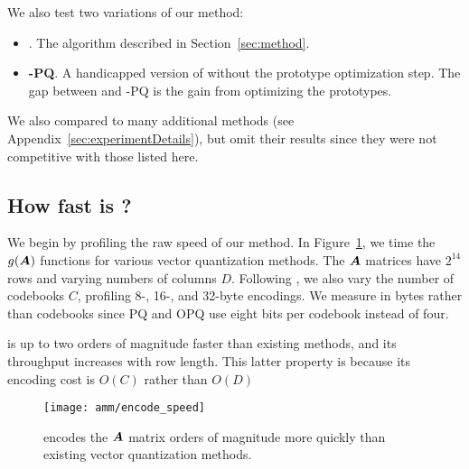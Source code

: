 We also test two variations of our method:
\vspace{-3mm}
\begin{itemize}\itemsep-.5mm
    \item \textbf{\ours}. The algorithm described in Section~\ref{sec:method}.
    \item \textbf{\ours-PQ}. A handicapped version of \oursp without the prototype optimization step. The gap between \oursp and \ours-PQ is the gain from optimizing the prototypes.
\end{itemize}
\vspace{-3mm}
We also compared to many additional methods (see Appendix~\ref{sec:experimentDetails}), but omit their results since they were not competitive with those listed here.

\vspace{-1mm}
\subsection{How fast is \ours?}
\vspace{-.5mm}

We begin by profiling the raw speed of our method. In Figure~\ref{fig:encodeSpeed}, we time the $g(\bm{A})$ functions for various vector quantization methods. The $\bm{A}$ matrices have $2^{14}$ rows and varying numbers of columns $D$. Following \citet{bolt}, we also vary the number of codebooks $C$, profiling 8-, 16-, and 32-byte encodings. We measure in bytes rather than codebooks since PQ and OPQ use eight bits per codebook instead of four.

\oursp is up to two orders of magnitude faster than existing methods, and its throughput increases with row length. This latter property is because its encoding cost is $O(C)$ rather than $O(D)$
\begin{figure}[h]
\begin{center}
\texttt{[image: amm/encode\_speed]}
\caption{\oursp encodes the $\bm{A}$ matrix orders of magnitude more quickly than existing vector quantization methods.}
\label{fig:encodeSpeed}
\end{center}
\end{figure}

